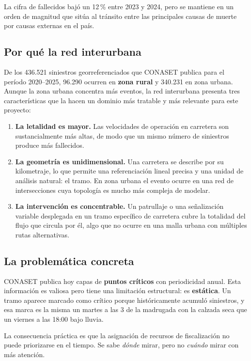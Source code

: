 \documentclass[11pt,a4paper]{article}
\begin{document}
La cifra de fallecidos bajó un 12\,\% entre 2023 y 2024, pero se mantiene en un
orden de magnitud que sitúa al tránsito entre las principales causas de muerte
por causas externas en el país.

\subsection{Por qué la red interurbana}

De los 436.521 siniestros georreferenciados que CONASET publica para el período
2020--2025, 96.290 ocurren en \textbf{zona rural} y 340.231 en zona urbana.
Aunque la zona urbana concentra más eventos, la red interurbana presenta tres
características que la hacen un dominio más tratable y más relevante para este
proyecto:

\begin{enumerate}
  \item \textbf{La letalidad es mayor.} Las velocidades de operación en
  carretera son sustancialmente más altas, de modo que un mismo número de
  siniestros produce más fallecidos.

  \item \textbf{La geometría es unidimensional.} Una carretera se describe por
  su kilometraje, lo que permite una referenciación lineal precisa y una unidad
  de análisis natural: el tramo. En zona urbana el evento ocurre en una red de
  intersecciones cuya topología es mucho más compleja de modelar.

  \item \textbf{La intervención es concentrable.} Un patrullaje o una
  señalización variable desplegada en un tramo específico de carretera cubre la
  totalidad del flujo que circula por él, algo que no ocurre en una malla urbana
  con múltiples rutas alternativas.
\end{enumerate}

\subsection{La problemática concreta}

CONASET publica hoy capas de \textbf{puntos críticos} con periodicidad anual.
Esta información es valiosa pero tiene una limitación estructural: es
\textbf{estática}. Un tramo aparece marcado como crítico porque históricamente
acumuló siniestros, y esa marca es la misma un martes a las 3 de la madrugada
con la calzada seca que un viernes a las 18:00 bajo lluvia.

La consecuencia práctica es que la asignación de recursos de fiscalización no
puede priorizarse en el tiempo. Se sabe \emph{dónde} mirar, pero no
\emph{cuándo} mirar con más atención.
\end{document}
